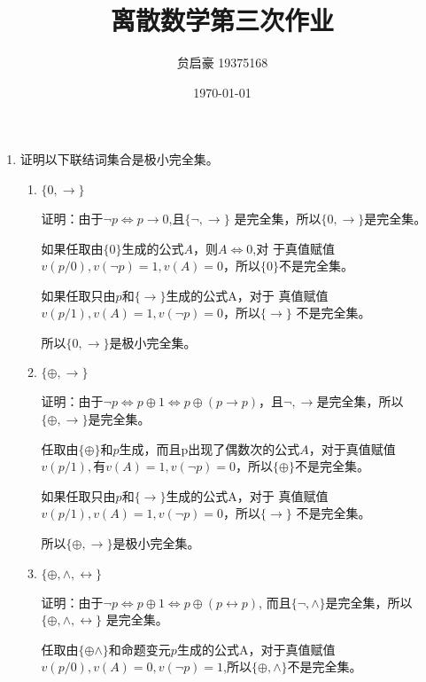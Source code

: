 \documentclass[UTF8]{ctexart}
\title{离散数学第三次作业}
\author{贠启豪 19375168}
\date{\today}
\begin{document}
   \maketitle
   \begin{enumerate}
        \item 证明以下联结词集合是极小完全集。
        \begin{enumerate}
           \item $\{0 , \rightarrow\}$
           
           证明：由于$\neg p\Leftrightarrow p\rightarrow 0$,且$\{\neg , \rightarrow\}$
           是完全集，所以$\{0, \rightarrow \}$是完全集。

           如果任取由$\{0\}$生成的公式$A$，则$A\Leftrightarrow 0$,对
           于真值赋值$v(p/0),v(\neg p)=1,v(A)=0$，所以$\{0\}$不是完全集。

           如果任取只由$p$和$\{\rightarrow \}$生成的公式A，对于
           真值赋值$v(p/1),v(A)=1,v(\neg p)=0$，所以$\{\rightarrow \}$
           不是完全集。

           所以$\{0 , \rightarrow\}$是极小完全集。

           \item $\{\oplus , \rightarrow\}$
           
            证明：由于$\neg p\Leftrightarrow p\oplus 1\Leftrightarrow p\oplus(p\rightarrow p)$，且$\neg,\rightarrow$是完全集，所以$\{\oplus,\rightarrow\}$是完全集。

            任取由$\{\oplus \}$和$p$生成，而且p出现了偶数次的公式$A$，对于真值赋值
            $v(p/1),有v(A)=1,v(\neg p)=0$，所以$\{\oplus \}$不是完全集。

            如果任取只由$p$和$\{\rightarrow \}$生成的公式A，对于
           真值赋值$v(p/1),v(A)=1,v(\neg p)=0$，所以$\{\rightarrow \}$
           不是完全集。

           所以$\{\oplus ,\rightarrow\}$是极小完全集。

           \item $\{\oplus , \wedge ,  \leftrightarrow \}$
           
           证明：由于$\neg p\Leftrightarrow p\oplus 1\Leftrightarrow p\oplus (p\leftrightarrow p)$,
           而且$\{\neg,\wedge \}$是完全集，所以$\{\oplus , \wedge ,  \leftrightarrow \}$
           是完全集。

           任取由$\{\oplus \wedge\}$和命题变元$p$生成的公式A，对于真值赋值
           $v(p/0),v(A)=0,v(\neg p)=1$,所以$\{\oplus, \wedge\}$不是完全集。


\end{enumerate}
\end{enumerate}
\end{document}
